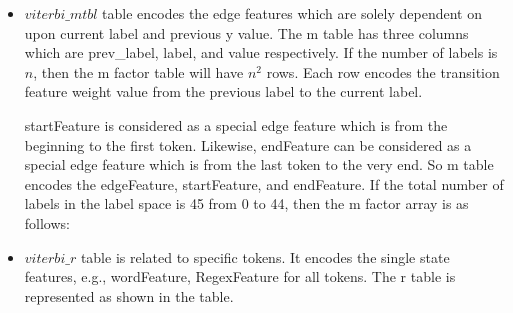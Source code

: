   \begin{itemize}
  \item
  $viterbi\_mtbl$ table
  encodes the edge features which are solely dependent on upon current label and
  previous y value. The m table has three columns which are prev\_label, label,
  and value respectively.
  If the number of labels is $n$, then the m factor table will have $n^2$
  rows. Each row encodes the transition feature weight value from the previous label
  to the current label.

  startFeature is considered as a special edge feature which is from the
  beginning to the first token. Likewise, endFeature can be considered
  as a special edge feature which is from the last token to the very end.
  So m table encodes the edgeFeature, startFeature, and endFeature.
  If the total number of labels in the label space is 45 from 0 to 44,
  then the m factor array is as follows:
  \item
  $viterbi\_r$ table
  is related to specific tokens. It encodes the single state features,
  e.g., wordFeature, RegexFeature for all tokens. The r table is represented as
  shown in the table.\\


\end{itemize}
